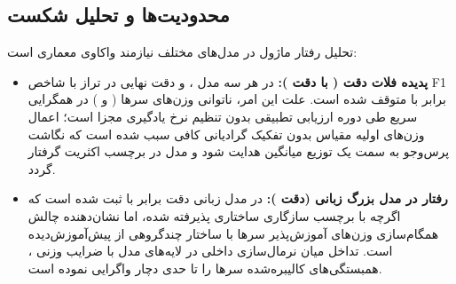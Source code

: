 \subsection{محدودیت‌ها و تحلیل شکست}
تحلیل رفتار ماژول در مدل‌های مختلف نیازمند واکاوی معماری است:
\begin{itemize}
    \item \textbf{پدیده فلات دقت ( با دقت ):} در هر سه مدل ،  و  دقت نهایی در تراز  با شاخص F1 برابر با  متوقف شده است. علت این امر، ناتوانی وزن‌های سرها ( و ) در همگرایی سریع طی دوره ارزیابی تطبیقی بدون تنظیم نرخ یادگیری مجزا است؛ اعمال وزن‌های اولیه مقیاس بدون تفکیک گرادیانی کافی سبب شده است که نگاشت پرس‌وجو به سمت یک توزیع میانگین هدایت شود و مدل در برچسب اکثریت گرفتار گردد.
    \item \textbf{رفتار در مدل بزرگ زبانی  (دقت ):} در مدل زبانی  دقت برابر با  ثبت شده است که اگرچه با برچسب سازگاری ساختاری  پذیرفته شده، اما نشان‌دهنده چالش همگام‌سازی وزن‌های آموزش‌پذیر سرها با ساختار چندگروهی از پیش‌آموزش‌دیده  است. تداخل میان نرمال‌سازی داخلی  در لایه‌های مدل با ضرایب وزنی ، همبستگی‌های کالیبره‌شده سرها را تا حدی دچار واگرایی نموده است.
\end{itemize}
